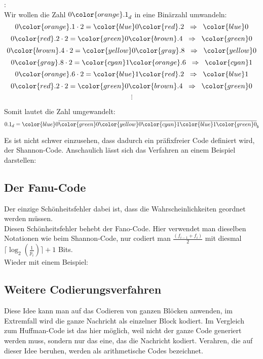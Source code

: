 \begin{bsp}:\\
    Wir wollen die Zahl $0{\color{orange}.1}_d$ in eine Binärzahl umwandeln:
    \[0{\color{orange}.1}\cdot 2={\color{blue}0}{\color{red}.2}\;\;\Rightarrow\;\;{\color{blue}0}\]
    \[0{\color{red}.2}\cdot 2={\color{green}0}{\color{brown}.4}\;\;\Rightarrow\;\;{\color{green}0}\]
    \[0{\color{brown}.4}\cdot 2={\color{yellow}0}{\color{gray}.8}\;\;\Rightarrow\;\;{\color{yellow}0}\]
    \[0{\color{gray}.8}\cdot 2={\color{cyan}1}{\color{orange}.6}\;\;\Rightarrow\;\;{\color{cyan}1}\]
    \[0{\color{orange}.6}\cdot 2={\color{blue}1}{\color{red}.2}\;\;\Rightarrow\;\;{\color{blue}1}\]
    \[0{\color{red}.2}\cdot 2={\color{green}0}{\color{brown}.4}\;\;\Rightarrow\;\;{\color{green}0}\]
    \[\vdots\]

Somit lautet die Zahl umgewandelt:
\[0.1_d={\color{blue}0}\overline{{\color{green}0}{\color{yellow}0}{\color{cyan}1}{\color{blue}1}{\color{green}0}}_b
\]
\end{bsp}

Es ist nicht schwer
einzusehen, dass dadurch ein präfixfreier Code definiert wird, der
Shannon-Code. 
Anschaulich lässt sich das Verfahren an einem Beispiel darstellen:
\ifdefined\uebsps

\fi

\subsection{Der Fanu-Code}
Der einzige Schönheitsfehler dabei ist, dass die Wahrscheinlichkeiten geordnet werden müssen. \\
Diesen Schönheitsfehler behebt der 
Fano-Code.
Hier verwendet man dieselben Notationen wie beim Shannon-Code,
nur codiert man
$\frac{(f_{i-1}+f_i)}{2}$ mit diesmal $\lceil \log_2(\frac{1}{p_i})\rceil+1$ Bits.\\
Wieder mit einem Beispiel:\\
\ifdefined\uebsps

\fi
\subsection{Weitere Codierungsverfahren}
Diese Idee kann man auf das Codieren von ganzen Blöcken anwenden, im
Extremfall wird die ganze Nachricht als einzelner Block kodiert. Im 
Vergleich zum Huffman-Code ist das hier möglich, weil nicht der ganze
Code generiert werden muss, sondern nur das eine, das die Nachricht kodiert.
Verahren, die auf dieser Idee beruhen, werden als arithmetische
Codes bezeichnet.


